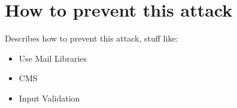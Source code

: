 \section[Mitigation Strategy]{How to prevent this attack}
	Describes how to prevent this attack, stuff like:
	\begin{itemize}
		\item Use Mail Libraries
		\item CMS
		\item Input Validation
	\end{itemize}